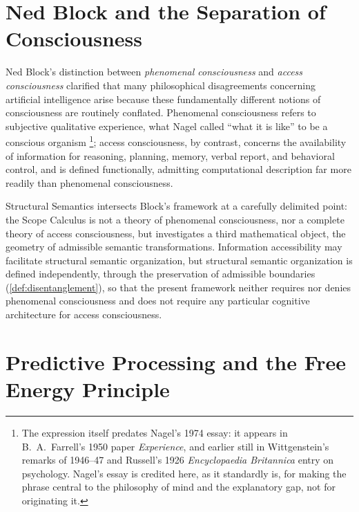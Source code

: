 \documentclass[11pt,twoside,openright]{book}
\numberwithin{equation}{chapter}
\theoremstyle{definition}
\theoremstyle{plain}
\theoremstyle{remark}
\theoremstyle{definition}
\begin{document}
\section{Ned Block and the Separation of Consciousness}

Ned Block's distinction between \emph{phenomenal consciousness} and
\emph{access consciousness} \cite{Block1995} clarified that many
philosophical disagreements concerning artificial intelligence arise
because these fundamentally different notions of consciousness are
routinely conflated. Phenomenal consciousness refers to subjective
qualitative experience, what Nagel called ``what it is like'' to be a
conscious organism \cite{Nagel1974}\footnote{The expression itself
predates Nagel's 1974 essay: it appears in B.~A.~Farrell's 1950 paper
\emph{Experience}, and earlier still in Wittgenstein's remarks of
1946--47 and Russell's 1926 \emph{Encyclopaedia Britannica} entry on
psychology. Nagel's essay is credited here, as it standardly is, for
making the phrase central to the philosophy of mind and the explanatory
gap, not for originating it.}; access consciousness, by contrast,
concerns the availability of information for reasoning, planning, memory,
verbal report, and behavioral control, and is defined functionally,
admitting computational description far more readily than phenomenal
consciousness.

Structural Semantics intersects Block's framework at a carefully
delimited point: the Scope Calculus is not a theory of phenomenal
consciousness, nor a complete theory of access consciousness, but
investigates a third mathematical object, the geometry of admissible
semantic transformations. Information accessibility may facilitate
structural semantic organization, but structural semantic organization is
defined independently, through the preservation of admissible boundaries
(\cref{def:disentanglement}), so that the present framework neither
requires nor denies phenomenal consciousness and does not require any
particular cognitive architecture for access consciousness.

\section{Predictive Processing and the Free Energy Principle}
\end{document}
